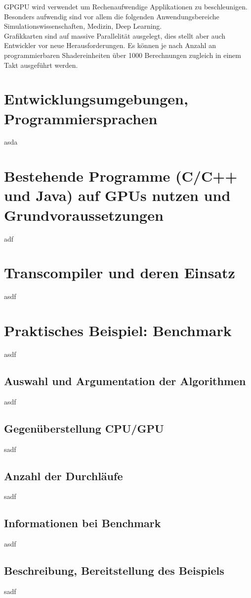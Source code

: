 \documentclass[letterpaper, 12pt]{article}
\let\tempsection\section
\renewcommand\section[1]{\vspace{-0.3cm}\tempsection{#1}\vspace{-0.3cm}}
\let\tempsubsection\subsection
\renewcommand\subsection[1]{\vspace{0cm}\tempsubsection{#1}\vspace{0cm}}
\begin{document}
GPGPU wird verwendet um Rechenaufwendige Applikationen zu beschleunigen. Besonders aufwendig sind vor allem die folgenden Anwendungsbereiche Simulationswissenschaften, Medizin, Deep Learning. \\

Grafikkarten sind auf massive Parallelität ausgelegt, dies stellt aber auch Entwickler vor neue Herausforderungen. Es können je nach Anzahl an programmierbaren Shadereinheiten über 1000 Berechnungen zugleich in einem Takt ausgeführt werden. \cite{elko} \cite{Ausarbeitung}

\section{Entwicklungsumgebungen, Programmiersprachen}
asda
\newpage

\section{Bestehende Programme (C/C++ und Java) auf GPUs nutzen und Grundvoraussetzungen}
adf
\newpage

\section{Transcompiler und deren Einsatz}
asdf
\newpage

\section{Praktisches Beispiel: Benchmark}
asdf
\subsection{Auswahl und Argumentation der Algorithmen}
asdf
\subsection{Gegenüberstellung CPU/GPU}
sadf
\subsection{Anzahl der Durchläufe}
sadf
\subsection{Informationen bei Benchmark}
asdf
\subsection{Beschreibung, Bereitstellung des Beispiels}
sadf

\newpage



\lstlistoflistings
\listoffigures
\end{document}
